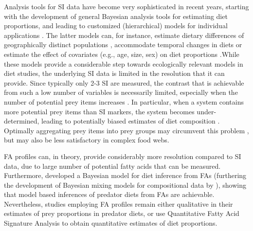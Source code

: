 \documentclass[fleqn,10pt]{wlpeerj}
\begin{document}
Analysis tools for SI data have become very sophisticated in recent
years, starting with the development of general Bayesian analysis
tools for estimating diet proportions, and leading to customized
(hierarchical) models for individual applications \citep{moore_incorporating_2008,hopkins_estimating_2012,parnell_bayesian_2012}. The latter models
can, for instance, estimate dietary differences of geographically
distinct populations \citep{semmens_quantifying_2009}, accommodate temporal
changes in diets or estimate the effect of covariates (e.g., age,
size, sex) on diet proportions \citep{parnell_bayesian_2012}.While these
models provide a considerable step towards ecologically relevant
models in diet studies, the underlying SI data is limited in the
resolution that it can provide. Since typically only 2-3 SI are
measured, the contrast that is achievable from such a low number of
variables is necessarily limited, especially when the number of
potential prey items increases \citep{phillips_source_2003,ward_quantitative_2011}. In particular, when a system contains more potential prey items than SI markers, the system becomes under-determined, leading to potentially biased estimates of diet composition \citep{ phillips_source_2003, fry_alternative_2013,semmens_statistical_2013,fry_minmax_2013, brett_resource_2014}. Optimally aggregating prey items into prey groups may
circumvent this problem \citep{ward_quantitative_2011}, but may also be less
satisfactory in complex food webs.

FA profiles can, in theory, provide considerably more resolution compared
to SI data, due to large number of potential fatty acids that can be
measured. Furthermore, \citet{blanchard_inference_2011} developed a
Bayesian model for diet inference from FAs (furthering the
development of Bayesian mixing models for compositional data by
\citet{billheimer_compositional_2001}), showing that model based
inferences of predator diets from FAs are
achievable. Nevertheless, studies employing FA profiles remain either qualitative
in their estimates of prey proportions in predator diets, or use
Quantitative Fatty Acid Signature Analysis \citep[QFASA; ][]{iverson_quantitative_2004} to
obtain quantitative estimates of diet proportions. 
\end{document}

